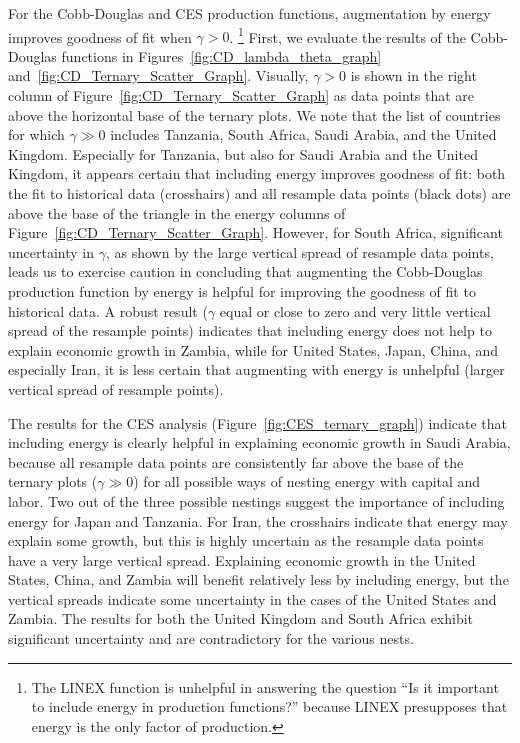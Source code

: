 \documentclass[preprint,authoryear,12pt]{elsarticle}\usepackage[]{graphicx}\usepackage[]{color}
\begin{document}
For the Cobb-Douglas and CES production functions, 
augmentation by energy improves goodness of fit when $\gamma > 0$.%
  \footnote{
  The LINEX function is unhelpful in answering the question 
  ``Is it important to include energy in production functions?'' 
  because LINEX presupposes that energy is the only factor of production.
  }
First, we evaluate the results of the Cobb-Douglas functions 
in Figures~\ref{fig:CD_lambda_theta_graph} and~\ref{fig:CD_Ternary_Scatter_Graph}. 
Visually, $\gamma > 0$ is shown in the right column 
of Figure~\ref{fig:CD_Ternary_Scatter_Graph} 
as data points that are above the horizontal base of the ternary plots. 
We note that the list of countries for which $\gamma \gg 0$ includes 
Tanzania, South Africa, Saudi Arabia, and the United Kingdom. 
Especially for Tanzania, but also for Saudi Arabia and the United Kingdom, 
it appears certain that including energy improves goodness of fit: 
both the fit to historical data (crosshairs) 
and all resample data points (black dots) 
are above the base of the triangle in the energy columns of Figure~\ref{fig:CD_Ternary_Scatter_Graph}. 
However, for South Africa, significant uncertainty in $\gamma$, 
as shown by the large vertical spread of resample data points, 
leads us to exercise caution in concluding that 
augmenting the Cobb-Douglas production function by energy 
is helpful for improving the goodness of fit to historical data. 
A robust result 
($\gamma$ equal or close to zero and very little vertical spread of the resample points) 
indicates that including energy does not help to explain economic growth in Zambia,
while for United States, Japan, China, and especially Iran, 
it is less certain that augmenting with energy is unhelpful 
(larger vertical spread of resample points).

The results for the CES analysis (Figure~\ref{fig:CES_ternary_graph}) 
indicate that including energy is clearly helpful 
in explaining economic growth in Saudi Arabia, 
because all resample data points are consistently far above the base of the ternary plots 
($\gamma \gg 0$) for all possible ways of nesting energy with capital and labor. 
Two out of the three possible nestings suggest the importance of including energy for Japan and Tanzania.
For Iran, the crosshairs indicate that energy may explain some growth, 
but this is highly uncertain as the resample data points have a very large vertical spread.  
Explaining economic growth in the United States, China, and Zambia will benefit 
relatively less by including energy, 
but the vertical spreads indicate some uncertainty 
in the cases of the United States and Zambia.  
The results for both the United Kingdom and South Africa 
exhibit significant uncertainty and are contradictory for the various nests.
\end{document}
